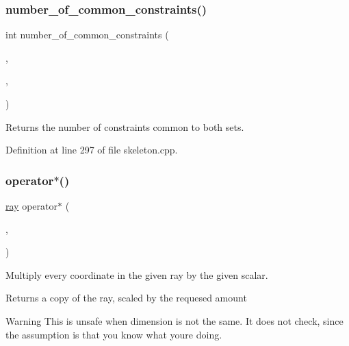 \subsubsection{\texorpdfstring{number\+\_\+of\+\_\+common\+\_\+constraints()}{number\_of\_common\_constraints()}}
{\footnotesize\ttfamily int number\+\_\+of\+\_\+common\+\_\+constraints (\begin{DoxyParamCaption}\item[{bool $\ast$}]{,  }\item[{bool $\ast$}]{,  }\item[{unsigned}]{ }\end{DoxyParamCaption})}

\begin{DoxyReturn}{Returns}
the number of constraints common to both sets. 
\end{DoxyReturn}


Definition at line 297 of file skeleton.\+cpp.

\mbox{\label{group___c_l_s_solvers_gae039f9fb46b8c57063342f6203add523}} 
\subsubsection{\texorpdfstring{operator$\ast$()}{operator*()}\hspace{0.1cm}{\footnotesize\ttfamily [1/4]}}
{\footnotesize\ttfamily \hyperlink{group___c_l_s_solvers_classray}{ray} operator$\ast$ (\begin{DoxyParamCaption}\item[{R\+A\+Y\+E\+N\+T\+\_\+\+T\+Y\+PE}]{,  }\item[{\hyperlink{group___c_l_s_solvers_classray}{ray} \&}]{ }\end{DoxyParamCaption})}



Multiply every coordinate in the given ray by the given scalar. 

\begin{DoxyReturn}{Returns}
a copy of the ray, scaled by the requesed amount 
\end{DoxyReturn}
\begin{DoxyWarning}{Warning}
This is unsafe when dimension is not the same. It does not check, since the assumption is that you know what you\textquotesingle{}re doing. 
\end{DoxyWarning}


